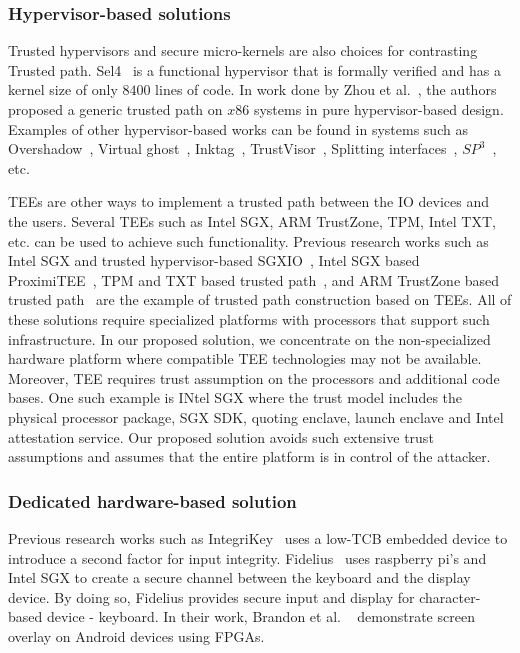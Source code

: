 \subsubsection{Hypervisor-based solutions} Trusted hypervisors and secure micro-kernels are also choices for contrasting Trusted path. Sel4~\cite{klein2009sel4} is a functional hypervisor that is formally verified and has a kernel size of only $8400$ lines of code. In work done by Zhou et al.~\cite{zhou2012building}, the authors proposed a generic trusted path on $x86$ systems in pure hypervisor-based design. Examples of other hypervisor-based works can be found in systems such as Overshadow~\cite{Overshadow}, Virtual ghost~\cite{criswell2014virtual}, Inktag~\cite{hofmann2013inktag}, TrustVisor~\cite{mccune2010trustvisor}, Splitting interfaces~\cite{ta2006splitting}, $SP^3$~\cite{yang2008using}, etc.

 TEEs are other ways to implement a trusted path between the IO devices and the users. Several TEEs such as Intel SGX, ARM TrustZone, TPM, Intel TXT, etc. can be used to achieve such functionality. Previous research works such as Intel SGX and trusted hypervisor-based SGXIO~\cite{weiser2017sgxio}, Intel SGX based ProximiTEE~\cite{dhar2018proximitee}, TPM and TXT based trusted path~\cite{filyanov2011uni}, and ARM TrustZone based trusted path~\cite{filyanov2011uni,sun2015trustotp} are the example of trusted path construction based on TEEs. All of these solutions require specialized platforms with processors that support such infrastructure. In our proposed solution, we concentrate on the non-specialized hardware platform where compatible TEE technologies may not be available.
Moreover, TEE requires trust assumption on the processors and additional code bases. One such example is INtel SGX where the trust model includes the physical processor package, SGX SDK, quoting enclave, launch enclave and Intel attestation service. Our proposed solution avoids such extensive trust assumptions and assumes that the entire platform is in control of the attacker.


\subsubsection{Dedicated hardware-based solution} Previous research works such as IntegriKey~\cite{IntegriKey} uses a low-TCB embedded device to introduce a second factor for input integrity. Fidelius~\cite{Fidelius} uses raspberry pi's and Intel SGX to create a secure channel between the keyboard and the display device. By doing so, Fidelius provides secure input and display for character-based device - keyboard. In their work, Brandon et al. ~\cite{brandon2017trusted} demonstrate screen overlay on Android devices using FPGAs.


